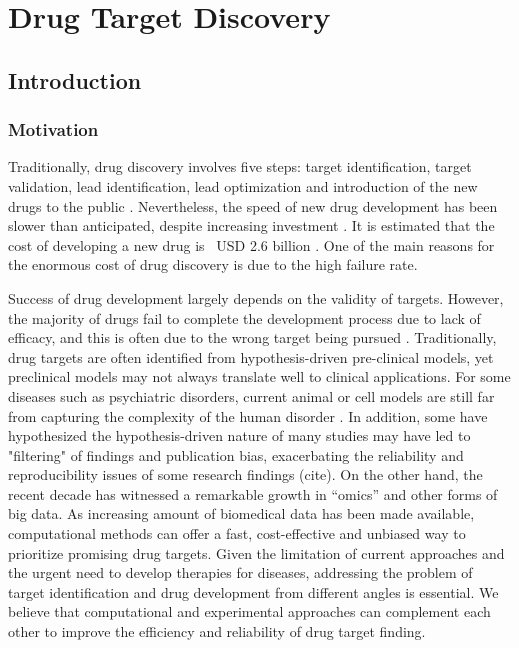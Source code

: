\chapter{Drug Target Discovery}

\section{Introduction}
  \subsection{Motivation}
    Traditionally, drug discovery involves five steps: target identification, target validation, lead identification, lead optimization and introduction of the new drugs to the public \cite{phoebe2008identifying}. Nevertheless, the speed of new drug development has been slower than anticipated, despite increasing investment \cite{pammolli2011productivity}. It is estimated that the cost of developing a new drug is ~USD 2.6 billion \cite{van1998socio}. One of the main reasons for the enormous cost of drug discovery is due to the high failure rate. 

    Success of drug development largely depends on the validity of targets. However, the majority of drugs fail to complete the development process due to lack of efficacy, and this is often due to the wrong target being pursued \cite{shih2018drug}. Traditionally, drug targets are often identified from hypothesis-driven pre-clinical models, yet preclinical models may not always translate well to clinical applications. For some diseases such as psychiatric disorders, current animal or cell models are still far from capturing the complexity of the human disorder \cite{nestler2010animal}. In addition, some have hypothesized the hypothesis-driven nature of many studies may have led to "filtering" of findings and publication bias, exacerbating the reliability and reproducibility issues of some research findings (cite). On the other hand, the recent decade has witnessed a remarkable growth in “omics” and other forms of big data. As increasing amount of biomedical data has been made available, computational methods can offer a fast, cost-effective and unbiased way to prioritize promising drug targets. Given the limitation of current approaches and the urgent need to develop therapies for diseases, addressing the problem of target identification and drug development from different angles is essential. We believe that computational and experimental approaches can complement each other to improve the efficiency and reliability of drug target finding. 

